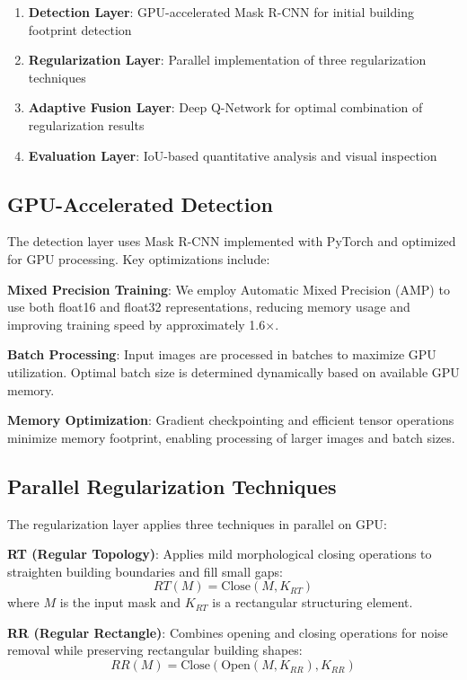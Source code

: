 \documentclass{article}
\begin{document}
\begin{enumerate}
\item \textbf{Detection Layer}: GPU-accelerated Mask R-CNN for initial building footprint detection
\item \textbf{Regularization Layer}: Parallel implementation of three regularization techniques
\item \textbf{Adaptive Fusion Layer}: Deep Q-Network for optimal combination of regularization results
\item \textbf{Evaluation Layer}: IoU-based quantitative analysis and visual inspection
\end{enumerate}

\subsection{GPU-Accelerated Detection}

The detection layer uses Mask R-CNN \cite{he2017mask} implemented with PyTorch and optimized for GPU processing. Key optimizations include:

\textbf{Mixed Precision Training}: We employ Automatic Mixed Precision (AMP) to use both float16 and float32 representations, reducing memory usage and improving training speed by approximately 1.6×.

\textbf{Batch Processing}: Input images are processed in batches to maximize GPU utilization. Optimal batch size is determined dynamically based on available GPU memory.

\textbf{Memory Optimization}: Gradient checkpointing and efficient tensor operations minimize memory footprint, enabling processing of larger images and batch sizes.

\subsection{Parallel Regularization Techniques}

The regularization layer applies three techniques in parallel on GPU:

\textbf{RT (Regular Topology)}: Applies mild morphological closing operations to straighten building boundaries and fill small gaps:
\begin{equation}
RT(M) = \text{Close}(M, K_{RT})
\end{equation}
where $M$ is the input mask and $K_{RT}$ is a rectangular structuring element.

\textbf{RR (Regular Rectangle)}: Combines opening and closing operations for noise removal while preserving rectangular building shapes:
\begin{equation}
RR(M) = \text{Close}(\text{Open}(M, K_{RR}), K_{RR})
\end{equation}
\end{document}
